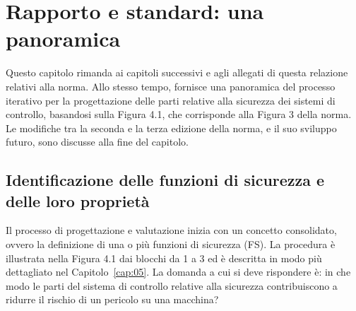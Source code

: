 \chapter{Rapporto e standard: una panoramica}
\label{cap:04}

Questo capitolo rimanda ai capitoli successivi e agli allegati di questa relazione relativi alla norma. Allo stesso tempo, fornisce una panoramica del processo iterativo per la progettazione delle parti relative alla sicurezza dei sistemi di controllo, basandosi sulla Figura 4.1, che corrisponde alla Figura 3 della norma. Le modifiche tra la seconda e la terza edizione della norma, e il suo sviluppo futuro, sono discusse alla fine del capitolo.

\begin{center}
    \begin{minipage}{\textwidth}
        \centering
        \captionsetup{hypcap=false}
        \resizebox{!}{0.72\textheight}{}
        \label{fig:04-01}
    \end{minipage}
\end{center}

\section{Identificazione delle funzioni di sicurezza e delle loro proprietà}
\label{sec:04-1}

Il processo di progettazione e valutazione inizia con un concetto consolidato, ovvero la definizione di una o più funzioni di sicurezza (FS). La procedura è illustrata nella Figura 4.1 dai blocchi da 1 a 3 ed è descritta in modo più dettagliato nel Capitolo~\ref{cap:05}. La domanda a cui si deve rispondere è: in che modo le parti del sistema di controllo relative alla sicurezza contribuiscono a ridurre il rischio di un pericolo su una macchina?

